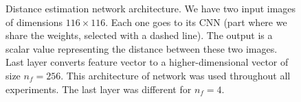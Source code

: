 \begin{figure}[ht!]
\begin{subfigure}[t]{0.8\linewidth}
    \end{subfigure}
    \caption{%
        Distance estimation network architecture.
        We have two input images of dimensions $116 \times 116$.
        Each one goes to its CNN (part where we share the weights, selected with a dashed line).
        The output is a scalar value representing the distance between these two images.
        Last layer converts feature vector to a higher-dimensional vector of size $n_f=256$. This architecture of network was used throughout all experiments. The last layer was different for $n_f=4$.
    }\label{fig:de-architecture}
\end{figure}
